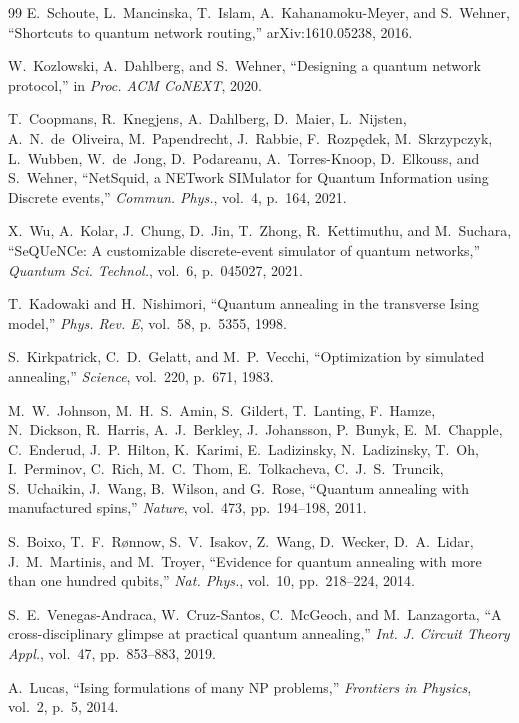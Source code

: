 \documentclass[twocolumn]{article}
\begin{document}
\begin{thebibliography}{99}
E.~Schoute, L.~Mancinska, T.~Islam, A.~Kahanamoku-Meyer, and
S.~Wehner, ``Shortcuts to quantum network routing,''
arXiv:1610.05238, 2016.

W.~Kozlowski, A.~Dahlberg, and S.~Wehner,
``Designing a quantum network protocol,''
in \emph{Proc. ACM CoNEXT}, 2020.

T.~Coopmans, R.~Knegjens, A.~Dahlberg, D.~Maier, L.~Nijsten,
A.~N.~de~Oliveira, M.~Papendrecht, J.~Rabbie, F.~Rozp\k{e}dek,
M.~Skrzypczyk, L.~Wubben, W.~de~Jong, D.~Podareanu,
A.~Torres-Knoop, D.~Elkouss, and S.~Wehner,
``NetSquid, a NETwork SIMulator for Quantum Information using Discrete
events,''
\emph{Commun. Phys.}, vol.~4, p.~164, 2021.

X.~Wu, A.~Kolar, J.~Chung, D.~Jin, T.~Zhong, R.~Kettimuthu, and
M.~Suchara, ``SeQUeNCe: A customizable discrete-event simulator of
quantum networks,''
\emph{Quantum Sci. Technol.}, vol.~6, p.~045027, 2021.

T.~Kadowaki and H.~Nishimori,
``Quantum annealing in the transverse Ising model,''
\emph{Phys. Rev. E}, vol.~58, p.~5355, 1998.

S.~Kirkpatrick, C.~D.~Gelatt, and M.~P.~Vecchi,
``Optimization by simulated annealing,''
\emph{Science}, vol.~220, p.~671, 1983.

M.~W.~Johnson, M.~H.~S.~Amin, S.~Gildert, T.~Lanting, F.~Hamze,
N.~Dickson, R.~Harris, A.~J.~Berkley, J.~Johansson, P.~Bunyk,
E.~M.~Chapple, C.~Enderud, J.~P.~Hilton, K.~Karimi, E.~Ladizinsky,
N.~Ladizinsky, T.~Oh, I.~Perminov, C.~Rich, M.~C.~Thom, E.~Tolkacheva,
C.~J.~S.~Truncik, S.~Uchaikin, J.~Wang, B.~Wilson, and G.~Rose,
``Quantum annealing with manufactured spins,''
\emph{Nature}, vol.~473, pp.~194--198, 2011.

S.~Boixo, T.~F.~R{\o}nnow, S.~V.~Isakov, Z.~Wang, D.~Wecker,
D.~A.~Lidar, J.~M.~Martinis, and M.~Troyer,
``Evidence for quantum annealing with more than one hundred qubits,''
\emph{Nat. Phys.}, vol.~10, pp.~218--224, 2014.

S.~E.~Venegas-Andraca, W.~Cruz-Santos, C.~McGeoch, and
M.~Lanzagorta, ``A cross-disciplinary glimpse at practical quantum
annealing,''
\emph{Int. J. Circuit Theory Appl.}, vol.~47, pp.~853--883, 2019.

A.~Lucas, ``Ising formulations of many NP problems,''
\emph{Frontiers in Physics}, vol.~2, p.~5, 2014.


\end{thebibliography}
\end{document}
